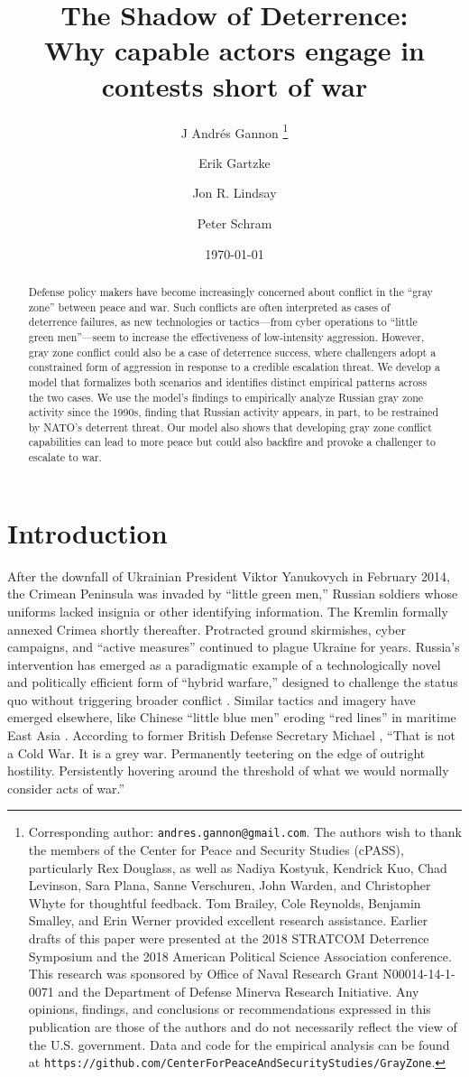 \documentclass[11pt,letterpaper,pdftex,dvipsnames,table]{article}
\title{The Shadow of Deterrence: \\ Why capable actors engage in contests short of war}
\author{J Andr\'{e}s Gannon %
	\thanks{Corresponding author: \texttt{andres.gannon@gmail.com}. The authors wish to thank the members of the Center for Peace and Security Studies (cPASS), particularly Rex Douglass, as well as Nadiya Kostyuk, Kendrick Kuo, Chad Levinson, Sara Plana, Sanne Verschuren, John Warden, and Christopher Whyte for thoughtful feedback. Tom Brailey, Cole Reynolds, Benjamin Smalley, and Erin Werner provided excellent research assistance. Earlier drafts of this paper were presented at the 2018 STRATCOM Deterrence Symposium and the 2018 American Political Science Association conference. This research was sponsored by Office of Naval Research Grant N00014-14-1-0071 and the Department of Defense Minerva Research Initiative. Any opinions, findings, and conclusions or recommendations expressed in this publication are those of the authors and do not necessarily reflect the view of the U.S. government. Data and code for the empirical analysis can be found at \texttt{https://github.com/CenterForPeaceAndSecurityStudies/GrayZone}.}}
\affil{Stanton Nuclear Security Fellow\\ Council on Foreign Relations}
\author{Erik Gartzke %
}
\affil{Department of Political Science\\ University of California, San Diego}
\author{Jon R. Lindsay %
}
\affil{School of Cybersecurity and Privacy \\ Georgia Institute of Technology}
\author{Peter Schram %
}
\affil{Department of Political Science\\ Vanderbilt University}
\date{\today}
\begin{document}
\maketitle


\begin{abstract}
\begin{singlespace}
\noindent 

Defense policy makers have become increasingly concerned about conflict in the ``gray zone'' between peace and war. Such conflicts are often interpreted as cases of deterrence failures, as new technologies or tactics---from cyber operations to ``little green men''---seem to increase the effectiveness of low-intensity aggression. However, gray zone conflict could also be a case of deterrence success, where challengers adopt a constrained form of aggression in response to a credible escalation threat. We develop a model that formalizes both scenarios and identifies distinct empirical patterns across the two cases. We use the model’s findings to empirically analyze Russian gray zone activity since the 1990s, finding that Russian activity appears, in part, to be restrained by NATO’s deterrent threat. Our model also shows that developing gray zone conflict capabilities can lead to more peace but could also backfire and provoke a challenger to escalate to war.

\end{singlespace}
\end{abstract}

\setcounter{page}{0}
\thispagestyle{empty}

\newpage

\section{Introduction}
After the downfall of Ukrainian President Viktor Yanukovych in February 2014, the Crimean Peninsula was invaded by “little green men,” Russian soldiers whose uniforms lacked insignia or other identifying information. The Kremlin formally annexed Crimea shortly thereafter. Protracted ground skirmishes, cyber campaigns, and ``active measures'' continued to plague Ukraine for years. Russia's intervention has emerged as a paradigmatic example of a technologically novel and politically efficient form of ``hybrid warfare,'' designed to challenge the status quo without triggering broader conflict \citep{marten_putinchoicesexplaining_2015, lanoszka_russianhybridwarfare_2016}. Similar tactics and imagery have emerged elsewhere, like Chinese ``little blue men'' eroding ``red lines'' in maritime East Asia \citep{green_counteringcoercionmaritime_2017}. According to former British Defense Secretary Michael \citet{fallon_speechdeliveredsecretary_2017}, ``That is not a Cold War. It is a grey war. Permanently teetering on the edge of outright hostility. Persistently hovering around the threshold of what we would normally consider acts of war.''
\end{document}
